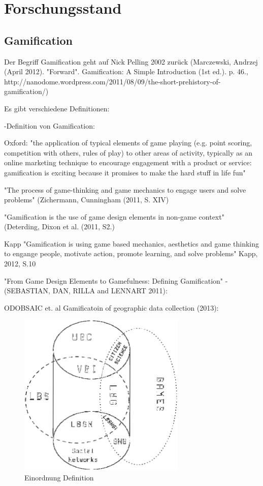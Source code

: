 \section{Forschungsstand}
\label{sec:S3_Forschungsstand}

\subsection{Gamification}
\label{subsec:S3_Gamification}

Der Begriff Gamification geht auf Nick Pelling 2002 zurück (Marczewski, Andrzej (April 2012). "Forward". Gamification: A Simple Introduction (1st ed.). p. 46., http://nanodome.wordpress.com/2011/08/09/the-short-prehistory-of-gamification/)

Es gibt verschiedene Definitionen:

-Definition von Gamification:

Oxford:
"the application of typical elements of game playing (e.g. point scoring, competition with others, rules of play) to other areas of activity, typically as an online marketing technique to encourage engagement with a product or service:
gamification is exciting because it promises to make the hard stuff in life fun"

"The process of game-thinking and game mechanics to engage users and solve problems"
(Zichermann, Cunningham (2011, S. XIV)

"Gamification is the use of game design elements in non-game context"
(Deterding, Dixon et al. (2011, S2.)

Kapp "Gamification is using game based mechanics, aesthetics and game thinking to engange people, motivate action, promote learning, and solve problems"
Kapp, 2012, S.10


"From Game Design Elements to Gamefulness: Defining Gamification" - (SEBASTIAN, DAN, RILLA and LENNART 2011):


ODOBSAIC et. al Gamificatoin of geographic data collection (2013):

\begin{figure}[H]
\begin{center}
\includegraphics[width=80mm]{images/ch3_img01_LBG_SN_etc.png}
\caption{Einordnung Definition}
\label{img:ch3_img01_LBG_SN_etc}
\end{center}
\end{figure}

